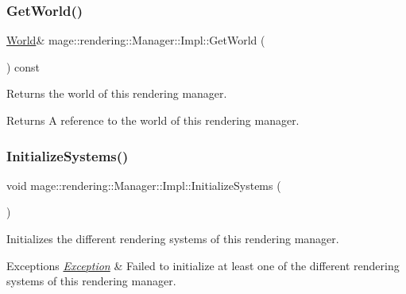 \subsubsection{\texorpdfstring{Get\+World()}{GetWorld()}}
{\footnotesize\ttfamily \mbox{\hyperlink{classmage_1_1rendering_1_1_world}{World}}\& mage\+::rendering\+::\+Manager\+::\+Impl\+::\+Get\+World (\begin{DoxyParamCaption}{ }\end{DoxyParamCaption}) const\hspace{0.3cm}{\ttfamily [noexcept]}}

Returns the world of this rendering manager.

\begin{DoxyReturn}{Returns}
A reference to the world of this rendering manager. 
\end{DoxyReturn}
\mbox{\label{classmage_1_1rendering_1_1_manager_1_1_impl_abb9706b54c07c3493ef906667051c336}} 
\subsubsection{\texorpdfstring{Initialize\+Systems()}{InitializeSystems()}}
{\footnotesize\ttfamily void mage\+::rendering\+::\+Manager\+::\+Impl\+::\+Initialize\+Systems (\begin{DoxyParamCaption}{ }\end{DoxyParamCaption})\hspace{0.3cm}{\ttfamily [private]}}

Initializes the different rendering systems of this rendering manager.


\begin{DoxyExceptions}{Exceptions}
{\em \mbox{\hyperlink{classmage_1_1_exception}{Exception}}} & Failed to initialize at least one of the different rendering systems of this rendering manager. \\
\hline
\end{DoxyExceptions}
\mbox{\label{classmage_1_1rendering_1_1_manager_1_1_impl_a2367cc9262863faeed5166bd53ba52c0}} 
